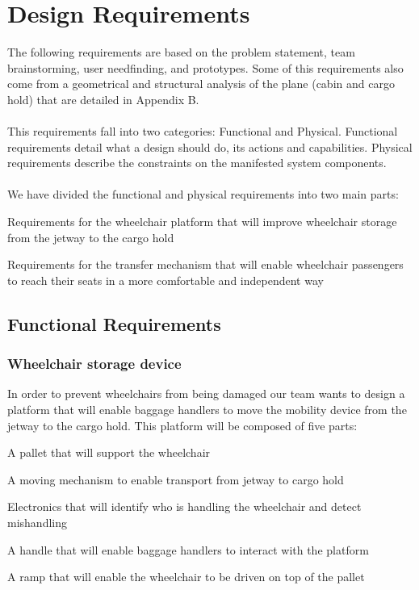 \chapter{Design Requirements}

The following requirements are based on the problem statement, team brainstorming, user needfinding, and prototypes. Some of this requirements also come from a geometrical and structural analysis of the plane (cabin and cargo hold) that are detailed in Appendix B.
\\
\\This requirements fall into two categories: Functional and Physical. Functional requirements detail what a design should do, its actions and capabilities. Physical requirements describe the constraints on the manifested system components. 
\\
\\ We have divided the functional and physical requirements into two main parts:
\begin{list}{-}{}
  \item Requirements for the wheelchair platform that will improve wheelchair storage from the jetway to the cargo hold
  \item Requirements for the transfer mechanism that will enable wheelchair passengers to reach their seats in a more comfortable and independent way
\end{list} 

\section{Functional Requirements}

\subsection*{Wheelchair storage device}

In order to prevent wheelchairs from being damaged our team wants to design a platform that will enable baggage handlers to move the mobility device from the jetway to the cargo hold. This platform will be composed of five parts:

\begin{list}{-}{}
  \item A pallet that will support the wheelchair
  \item A moving mechanism to enable transport from jetway to cargo hold
  \item Electronics that will identify who is handling the wheelchair and detect mishandling
  \item A handle that will enable baggage handlers to interact with the platform
  \item A ramp that will enable the wheelchair to be driven on top of the pallet
\end{list}


